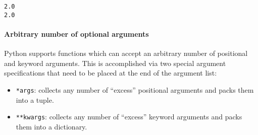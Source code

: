 \documentclass[10pt]{scrartcl}
\providecommand{\tightlist}{%
      \setlength{\itemsep}{0pt}\setlength{\parskip}{0pt}}
\begin{document}
    \begin{Verbatim}[commandchars=\\\{\}]
2.0
2.0
    \end{Verbatim}

    \hypertarget{arbitrary-number-of-optional-arguments}{%
\paragraph{Arbitrary number of optional
arguments}\label{arbitrary-number-of-optional-arguments}}

Python supports functions which can accept an arbitrary number of
positional and keyword arguments. This is accomplished via two special
argument specifications that need to be placed at the end of the
argument list:

\begin{itemize}
\tightlist
\item
  \texttt{*args}: collects any number of ``excess'' positional arguments
  and packs them into a tuple.
\item
  \texttt{**kwargs}: collects any number of ``excess'' keyword arguments
  and packs them into a dictionary.
\end{itemize}
\end{document}
